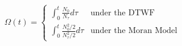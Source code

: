 \documentclass[11pt]{article}
\begin{document}
\begin{equation}
	\Omega(t) = \begin{cases}
		\int_{0}^t \frac{N_0}{N_\tau} d\tau &\text{under the DTWF}\\[2ex]
		\int_{0}^t \frac{N_0^2/2}{N_\tau^2/2} d\tau  &\text{under the Moran Model}
	\end{cases}
\end{equation}








\end{document}

